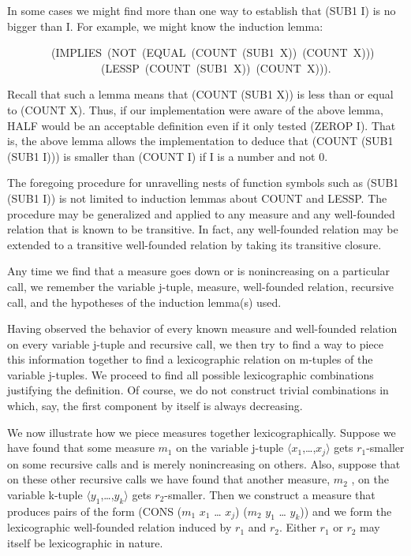 \documentclass[11pt]{book}
\newenvironment{pubasis}{\begin{flushleft}\ttfamily\small}{\normalsize\rmfamily\end{flushleft}}
\begin{document}
In some cases we might find more than one way to establish that
(SUB1 I) is no bigger than I.  For example, we might know the
induction lemma:
\begin{pubasis}
~~~~~~~~(IMPLIES~(NOT~(EQUAL~(COUNT~(SUB1~X))~(COUNT~X)))\\
~~~~~~~~~~~~~~~~~(LESSP~(COUNT~(SUB1~X))~(COUNT~X))).\\
\end{pubasis}
Recall that such a lemma means that (COUNT (SUB1 X)) is less than or
equal to (COUNT X).  Thus, if our implementation were aware
of the above lemma, HALF would be an acceptable definition even if it
only tested (ZEROP I).  That is, the above lemma allows the implementation
to deduce that (COUNT (SUB1 (SUB1 I))) is smaller than (COUNT I) if I is a number and not 0.

The foregoing procedure for unravelling nests of function symbols
such as (SUB1 (SUB1 I)) is not limited to induction lemmas about
COUNT and LESSP.  The procedure may be generalized and applied
to any measure and any well-founded relation that is known to
be transitive.  In fact, any well-founded relation may be extended
to a transitive well-founded relation by taking its transitive
closure.

Any time we find that a measure goes down or is nonincreasing on a
particular call, we remember the variable j-tuple, measure, well-founded
relation, recursive call, and the hypotheses of the induction
lemma(s) used.  

Having observed the behavior of every known measure and well-founded
relation on every variable j-tuple and recursive call, we then try
to find a way to piece this information together to find a
lexicographic relation  on m-tuples of the variable j-tuples.
We proceed to find all possible lexicographic combinations justifying
the definition.  Of course, we do not construct trivial combinations
in which, say, the first component by itself is always decreasing.

We now illustrate how we piece measures together lexicographically.  Suppose
we have found that some measure $m_{1}$ on the variable j-tuple
$\langle x_{1}$,\ldots{},$x_{j} \rangle$ gets $r_{1}$-smaller on some recursive calls
and is merely nonincreasing on others.  Also, suppose that
on these other recursive calls we have found that another measure, $m_{2}$ , on
the variable k-tuple
$\langle y_{1}$,\ldots{},$y_{k} \rangle$ gets $r_{2}$-smaller.  Then we construct
a measure that produces pairs of the form (CONS ($m_{1}$ $x_{1}$ \ldots{} $x_{j}$) ($m_{2}$ $y_{1}$ \ldots{} $y_{k}$))
and we  form the lexicographic well-founded relation induced by $r_{1}$ and $r_{2}$.
Either $r_{1}$ or $r_{2}$ may itself
be lexicographic in nature.
\end{document}
